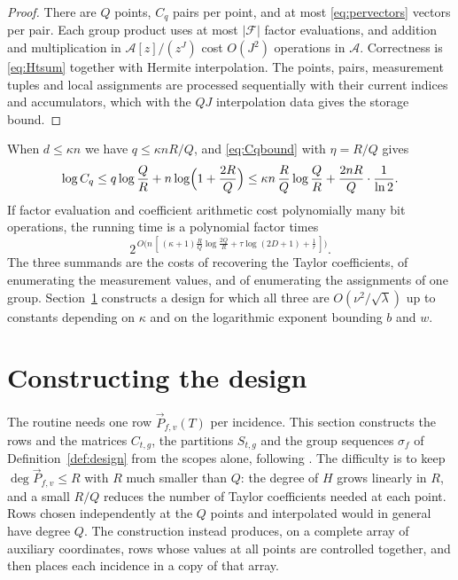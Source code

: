 \documentclass[11pt,reqno]{amsart}
\numberwithin{equation}{section}
\theoremstyle{plain}
\theoremstyle{definition}
\theoremstyle{remark}
\newcommand{\A}{\mathcal{A}}
\newcommand{\F}{\mathcal{F}}
\newcommand{\PP}{\vec{P}}
\begin{document}
\begin{proof}
There are $Q$ points, $C_q$ pairs per point, and at most \eqref{eq:pervectors}
vectors per pair. Each group product uses at most $|\F|$ factor evaluations, and
addition and multiplication in $\A[z]/(z^J)$ cost $O(J^2)$ operations in $\A$.
Correctness is \eqref{eq:Htsum} together with Hermite interpolation. The points,
pairs, measurement tuples and local assignments are processed sequentially with
their current indices and accumulators, which with the $QJ$ interpolation data
gives the storage bound.
\end{proof}

When $d\le\kappa n$ we have $q\le\kappa nR/Q$, and \eqref{eq:Cqbound} with
$\eta=R/Q$ gives
\begin{equation}\label{eq:logCq}
  \log C_q\le q\log\frac QR+n\log\Bigl(1+\frac{2R}{Q}\Bigr)
  \le \kappa n\,\frac RQ\log\frac QR+\frac{2nR}{Q}\cdot\frac{1}{\ln2}.
\end{equation}
If factor evaluation and coefficient arithmetic cost polynomially many bit
operations, the running time is a polynomial factor times
\begin{equation}\label{eq:threecosts}
  2^{\,O\bigl(n\,[\,(\kappa+1)\frac RQ\log\frac{2Q}{R}+\tau\log(2D+1)+\frac1r\,]\bigr)} .
\end{equation}
The three summands are the costs of recovering the Taylor coefficients, of
enumerating the measurement values, and of enumerating the assignments of one
group. Section~\ref{sec:design} constructs a design for which all three are
$O(\nu^2/\sqrt\lambda)$ up to constants depending on $\kappa$ and on the
logarithmic exponent bounding $b$ and $w$.

\section{Constructing the design}\label{sec:design}

The routine needs one row $\PP_{f,v}(T)$ per incidence. This section constructs
the rows and the matrices $C_{t,g}$, the partitions $S_{t,g}$ and the group
sequences $\sigma_f$ of Definition~\ref{def:design} from the scopes alone,
following \cite[Section 4]{OAI26}. The difficulty is to keep
$\deg\PP_{f,v}\le R$ with $R$ much smaller than $Q$: the degree of $H$ grows
linearly in $R$, and a small $R/Q$ reduces the number of Taylor coefficients
needed at each point. Rows chosen independently at the $Q$ points and
interpolated would in general have degree $Q$. The construction instead
produces, on a complete array of auxiliary coordinates, rows whose values at all
points are controlled together, and then places each incidence in a copy of that
array.
\end{document}
